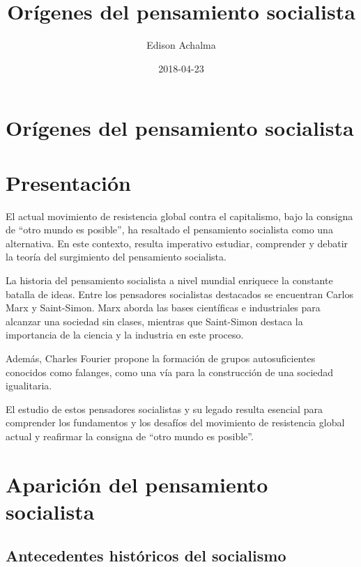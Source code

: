 \documentclass[
  jou,
  floatsintext,
  longtable,
  a4paper,
  nolmodern,
  notxfonts,
  notimes,
  12pt,
  colorlinks=true,linkcolor=blue,citecolor=blue,urlcolor=blue]{apa7}
\title{Orígenes del pensamiento socialista}
\author{Edison Achalma}
\affiliation{
{Escuela Profesional de Economía, Universidad Nacional de San Cristóbal
de Huamanga}}
\date{2018-04-23}
\begin{document}
\maketitle


\hypertarget{toc}{}
\tableofcontents
\newpage
\section[Introduction]{Orígenes del pensamiento socialista}

\setcounter{secnumdepth}{3}

\setlength\LTleft{0pt}




\section{Presentación}\label{presentaciuxf3n}

El actual movimiento de resistencia global contra el capitalismo, bajo
la consigna de ``otro mundo es posible'', ha resaltado el pensamiento
socialista como una alternativa. En este contexto, resulta imperativo
estudiar, comprender y debatir la teoría del surgimiento del pensamiento
socialista.

La historia del pensamiento socialista a nivel mundial enriquece la
constante batalla de ideas. Entre los pensadores socialistas destacados
se encuentran Carlos Marx y Saint-Simon. Marx aborda las bases
científicas e industriales para alcanzar una sociedad sin clases,
mientras que Saint-Simon destaca la importancia de la ciencia y la
industria en este proceso.

Además, Charles Fourier propone la formación de grupos autosuficientes
conocidos como falanges, como una vía para la construcción de una
sociedad igualitaria.

El estudio de estos pensadores socialistas y su legado resulta esencial
para comprender los fundamentos y los desafíos del movimiento de
resistencia global actual y reafirmar la consigna de ``otro mundo es
posible''.

\section{Aparición del pensamiento
socialista}\label{apariciuxf3n-del-pensamiento-socialista}

\subsection{Antecedentes históricos del
socialismo}\label{antecedentes-histuxf3ricos-del-socialismo}
\end{document}
